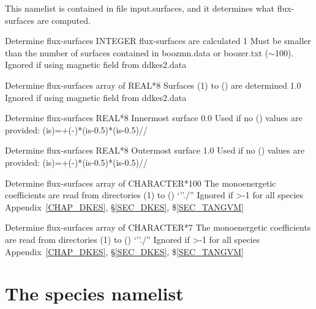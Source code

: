 This namelist is contained in file {\ttfamily input.surfaces}, and it determines what flux-surfaces are computed. 

{Determine flux-surfaces}
{INTEGER}
{ flux-surfaces are calculated}
{1}%
{Must be smaller than the number of surfaces contained in {\ttfamily boozmn.data} or {\ttfamily boozer.txt} ($\sim$100). Ignored if using magnetic field from {\ttfamily ddkes2.data}}
{}

{Determine flux-surfaces}
{array of REAL*8}
{Surfaces (1) to () are determined}
{1.0}%
{Ignored if using magnetic field from {\ttfamily ddkes2.data}}
{}

{Determine flux-surfaces}
{REAL*8}
{Innermost surface}
{0.0}%
{Used if no () values are provided: (is)=+(-)*(is-0.5)*(is-0.5)//}
{}

{Determine flux-surfaces}
{REAL*8}
{Outermost surface}
{1.0}%
{Used if no () values are provided: (is)=+(-)*(is-0.5)*(is-0.5)//}
{}

{Determine flux-surfaces}
{array of CHARACTER*100}
{The monoenergetic coefficients are read from directories (1) to ()}
{`''./''}
{Ignored if >-1 for all species}
{Appendix~\ref{CHAP_DKES}, \S\ref{SEC_DKES}, \$\ref{SEC_TANGVM}}
  
{Determine flux-surfaces}
{array of CHARACTER*7}
{The monoenergetic coefficients are read from directories (1) to ()}
{`''./''}
{Ignored if >-1 for all species}
{Appendix~\ref{CHAP_DKES}, \S\ref{SEC_DKES}, \$\ref{SEC_TANGVM}}



\section{The {\ttfamily species} namelist}\label{SEC_SPE}


